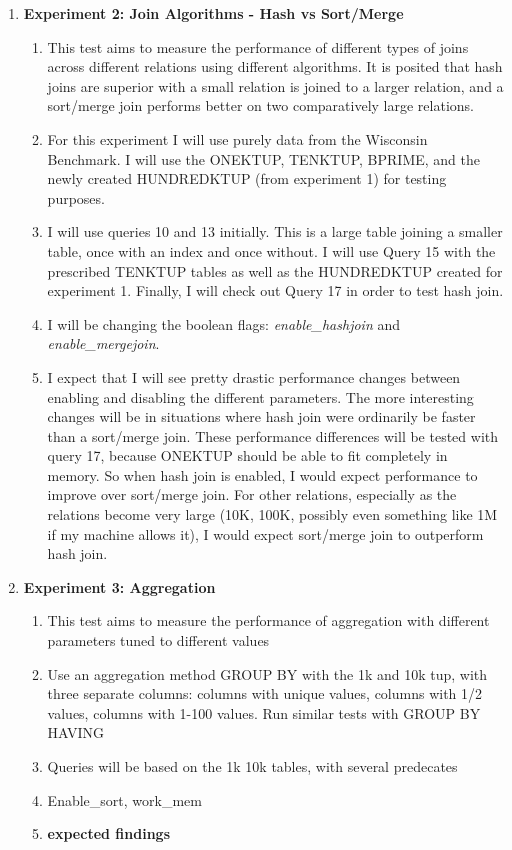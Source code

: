 \documentclass[11pt,letterpaper]{article}
\begin{document}
\begin{enumerate}
\begin{enumerate}
\begin{enumerate}
	\end{enumerate}
	 
	\item \textbf{Experiment 2: Join Algorithms - Hash vs Sort/Merge}
	
	\begin{enumerate}
		
	 	\item This test aims to measure the performance of different types of joins across different relations using different algorithms.  It is posited that hash joins are superior with a small relation is joined to a larger relation, and a sort/merge join performs better on two comparatively large relations.  
	 	\item For this experiment I will use purely data from the Wisconsin Benchmark.  I will use the ONEKTUP, TENKTUP, BPRIME, and the newly created HUNDREDKTUP (from experiment 1) for testing purposes. 
	 	\item I will use queries 10 and 13 initially.  This is a large table joining a smaller table, once with an index and once without. I will use Query 15 with the prescribed TENKTUP tables as well as the HUNDREDKTUP created for experiment 1.  Finally, I will check out Query 17 in order to test hash join. 
	 	\item I will be changing the boolean flags:  \textit{enable\_hashjoin} and \textit{enable\_mergejoin}. 
	 	\item I expect that I will see pretty drastic performance changes between enabling and disabling the different parameters. The more interesting changes will be in situations where hash join were ordinarily be faster than a sort/merge join.  These performance differences will be tested with query 17, because ONEKTUP should be able to fit completely in memory.  So when hash join is enabled, I would expect performance to improve over sort/merge join.  For other relations, especially as the relations become very large (10K, 100K, possibly even something like 1M if my machine allows it), I would expect sort/merge join to outperform hash join.
	 	
	\end{enumerate}

 	\item \textbf{Experiment 3: Aggregation}
 	\begin{enumerate}
 		\item This test aims to measure the performance of aggregation with different parameters tuned to different values
 		\item Use an aggregation method GROUP BY with the 1k and 10k tup, with three separate columns: columns with unique values, columns with 1/2 values, columns with 1-100 values.  Run similar tests with GROUP BY HAVING
 		\item Queries will be based on the 1k 10k tables, with several predecates 
 		\item Enable\_sort, work\_mem
 		\item \textbf{expected findings}
 	\end{enumerate}


\end{enumerate}
\end{enumerate}
\end{document}

